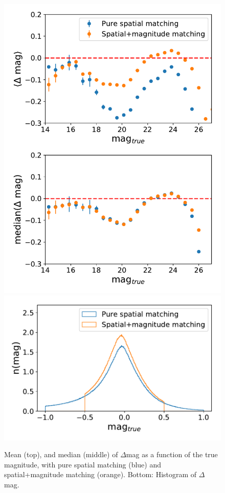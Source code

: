 \documentclass[twocolumn]{aastex62}
\begin{document}
\begin{figure}
\centering
\includegraphics[width=0.9\columnwidth]{matching_comparison_galaxies.pdf}
\includegraphics[width=0.9\columnwidth]{mag_hist_total.pdf}
\caption{Mean (top), and median (middle) of $\Delta$mag as a function of the true magnitude, with pure spatial matching (blue) and spatial+magnitude matching (orange). Bottom: Histogram of $\Delta$ mag.}
\label{fig:matching_comparison}
\end{figure}
\end{document}

